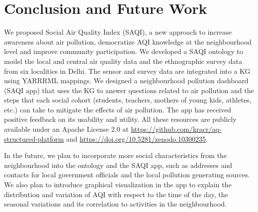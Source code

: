 \section{Conclusion and Future Work}
\label{sec:conclusion}

We proposed Social Air Quality Index (SAQI), a new approach to increase awareness about air pollution,  democratize AQI knowledge at the neighbourhood level and improve community participation. We developed a SAQI ontology to model the local and central air quality data and the ethnographic survey data from six localities in Delhi. The sensor and survey data are integrated into a KG using YARRRML mappings. We designed a neighbourhood pollution dashboard (SAQI app) that uses the KG to answer questions related to air pollution and the steps that each social cohort (students, teachers, mothers of young kids, athletes, etc.) can take to mitigate the effects of air pollution. The app has received positive feedback on its usability and utility. All these resources are publicly available under an Apache License 2.0 at \url{https://github.com/kracr/aq-structured-platform} and \url{https://doi.org/10.5281/zenodo.10300235}. 

In the future, we plan to incorporate more social characteristics from the neighbourhood into the ontology and the SAQI app, such as addresses and contacts for local government officials and the local pollution generating sources. We also plan to introduce graphical visualization in the app to explain the distribution and variation of AQI with respect to the time of the day, the seasonal variations and its correlation to activities in the neighbourhood.

